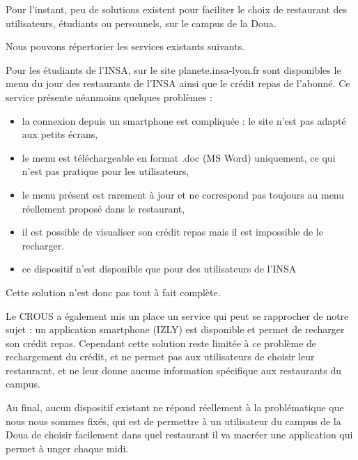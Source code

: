 Pour l’instant, peu de solutions existent pour faciliter le choix de
restaurant des
utilisateurs, étudiants ou personnels, sur le campus de la Doua. 

Nous pouvons répertorier les services existants suivants.

Pour les étudiants de l'INSA, sur le site planete.insa-lyon.fr sont disponibles 
le menu du jour des restaurants de l'INSA ainsi que le crédit repas de 
l'abonné. Ce service présente néanmoins quelques problèmes : 
\begin{itemize}
\item la connexion depuis un smartphone est compliquée : le site n'est pas 
adapté aux petits écrans,
\item le menu est téléchargeable en format .doc (MS Word) uniquement, ce qui 
n'est pas pratique pour les utilisateurs,
\item le menu présent est rarement à jour et ne correspond pas toujours au 
menu réellement proposé dans le restaurant,
\item il est possible de visualiser son crédit repas mais il est impossible 
de le recharger.
\item ce dispositif n'est disponible que pour des utilisateurs de l'INSA
\end{itemize}

Cette solution n'est donc pas tout à fait complète.

Le CROUS a également mis un place un service qui peut se rapprocher de notre 
sujet : un application smartphone (IZLY) est disponible et permet de 
recharger son crédit repas. Cependant cette solution reste limitée à ce 
problème de rechargement du crédit, et ne permet pas aux utilisateurs 
de choisir leur restaura:nt, et ne leur donne aucune information spécifique 
aux restaurants du campus.

Au final, aucun dispositif existant ne répond réellement à la problématique 
que nous nous sommes fixés, qui est de permettre à un utilisateur du
campus de la Doua de choisir facilement dans quel restaurant il va
macréer une application qui permet à 
unger chaque midi.

